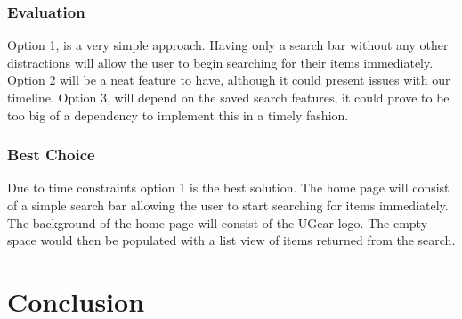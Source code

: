 \documentclass[journal,compsoc, 10pt, draftclsnofoot, onecolumn]{IEEEtran}
\begin{document}
\subsubsection{Evaluation}
Option 1, is a very simple approach. Having only a search bar without any other 
distractions will allow the user to begin searching for their items immediately. 
Option 2 will be a neat feature to have, although it could present issues with 
our timeline. Option 3, will depend on the saved search features, it could prove 
to be too big of a dependency to implement this in a timely fashion.
\subsubsection{Best Choice}
Due to time constraints option 1 is the best solution. The home page will 
consist of a simple search bar allowing the user to start searching for items 
immediately. The background of the home page will consist of the UGear logo. 
The empty space would then be populated with a list view of items returned from the search.
\section{Conclusion}
\end{document}
